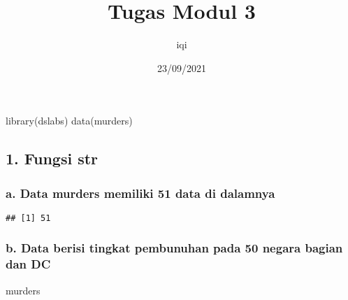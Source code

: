 \documentclass[
]{article}
\title{Tugas Modul 3}
\author{iqi}
\date{23/09/2021}
\newenvironment{Shaded}{\begin{snugshade}}{\end{snugshade}}
\newcommand{\FunctionTok}[1]{\textcolor[rgb]{0.00,0.00,0.00}{#1}}
\newcommand{\NormalTok}[1]{#1}
\newcommand{\SpecialCharTok}[1]{\textcolor[rgb]{0.00,0.00,0.00}{#1}}
\begin{document}
\maketitle

\begin{Shaded}
\begin{Highlighting}[]
\FunctionTok{library}\NormalTok{(dslabs)}
\FunctionTok{data}\NormalTok{(murders)}
\end{Highlighting}
\end{Shaded}

\hypertarget{fungsi-str}{%
\subsection{1. Fungsi str}\label{fungsi-str}}

\hypertarget{a.-data-murders-memiliki-51-data-di-dalamnya}{%
\subsubsection{a. Data murders memiliki 51 data di
dalamnya}\label{a.-data-murders-memiliki-51-data-di-dalamnya}}

\begin{Shaded}
\end{Shaded}

\begin{verbatim}
## [1] 51
\end{verbatim}

\hypertarget{b.-data-berisi-tingkat-pembunuhan-pada-50-negara-bagian-dan-dc}{%
\subsubsection{b. Data berisi tingkat pembunuhan pada 50 negara bagian
dan
DC}\label{b.-data-berisi-tingkat-pembunuhan-pada-50-negara-bagian-dan-dc}}

\begin{Shaded}
\begin{Highlighting}[]
\NormalTok{murders}
\end{Highlighting}
\end{Shaded}
\end{document}

